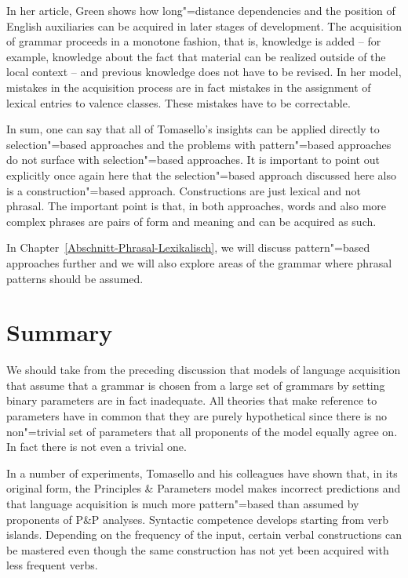 In her article, Green shows how long"=distance dependencies and the position of English auxiliaries can be acquired in later stages of development.
The acquisition of grammar proceeds in a monotone fashion, that is, knowledge is added -- for example, knowledge about the fact that
material can be realized outside of the local context -- and previous knowledge does not have to be revised.
In her model, mistakes in the acquisition process are in fact mistakes in the assignment of lexical
entries to valence classes. These mistakes have to be correctable. 

In sum, one can say that all of Tomasello's insights can be applied directly to selection"=based approaches and the problems with pattern"=based
approaches do not surface with selection"=based approaches. It is important to point out explicitly once again here that the selection"=based approach
discussed here also is a construction"=based approach. Constructions are just lexical and not phrasal.
The important point is that, in both approaches, words and also more complex phrases are pairs of form and meaning and can be acquired as such.

In Chapter~\ref{Abschnitt-Phrasal-Lexikalisch}, we will discuss pattern"=based approaches further
and we will also explore areas of the grammar where phrasal patterns should be assumed.

\section{Summary}

We should take from the preceding discussion that models of language acquisition that assume that a grammar is chosen
from a large set of grammars by setting binary parameters are in fact inadequate.
All theories that make reference to parameters have in common that they are purely hypothetical since there is no
non"=trivial set of parameters that all proponents of the model equally agree on. In fact there is
not even a trivial one.

In a number of experiments, Tomasello and his colleagues have shown that, in its original form, the Principles \& Parameters model makes incorrect
predictions and that language acquisition is much more pattern"=based than assumed by proponents of P\&P analyses.
Syntactic competence develops starting from verb islands. Depending on the frequency of the input, certain verbal constructions can be
mastered even though the same construction has not yet been acquired with less frequent verbs.

